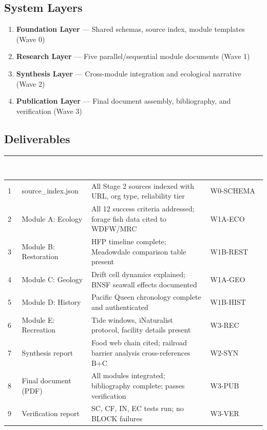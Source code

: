 \documentclass[11pt,letterpaper]{article}
\newcommand{\tableheader}[1]{\textbf{\sffamily\textcolor{white}{#1}}}
\begin{document}
\subsection{System Layers}

\begin{enumerate}
  \item \textbf{Foundation Layer} --- Shared schemas, source index, module templates (Wave 0)
  \item \textbf{Research Layer} --- Five parallel/sequential module documents (Wave 1)
  \item \textbf{Synthesis Layer} --- Cross-module integration and ecological narrative (Wave 2)
  \item \textbf{Publication Layer} --- Final document assembly, bibliography, and verification (Wave 3)
\end{enumerate}

\subsection{Deliverables}

\begin{center}
\begin{tabularx}{\textwidth}{C{0.5cm}L{3.5cm}L{4cm}L{2.5cm}}
\toprule
{}
\tableheader{\#} & \tableheader{Deliverable} & \tableheader{Acceptance Criteria} & \tableheader{Component Spec} \\
 & source\_index.json & All Stage 2 sources indexed with URL, org type, reliability tier & W0-SCHEMA \\
2 & Module A: Ecology & All 12 success criteria addressed; forage fish data cited to WDFW/MRC & W1A-ECO \\
3 & Module B: Restoration & HFP timeline complete; Meadowdale comparison table present & W1B-REST \\
4 & Module C: Geology & Drift cell dynamics explained; BNSF seawall effects documented & W1A-GEO \\
5 & Module D: History & Pacific Queen chronology complete and authenticated & W1B-HIST \\
6 & Module E: Recreation & Tide windows, iNaturalist protocol, facility details present & W3-REC \\
7 & Synthesis report & Food web chain cited; railroad barrier analysis cross-references B+C & W2-SYN \\
8 & Final document (PDF) & All modules integrated; bibliography complete; passes verification & W3-PUB \\
9 & Verification report & SC, CF, IN, EC tests run; no BLOCK failures & W3-VER \\
\bottomrule
\end{tabularx}
\end{center}
\end{document}
